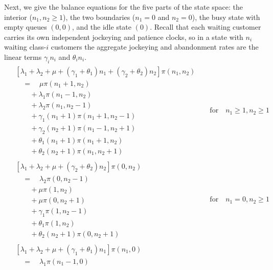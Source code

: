 Next, we give the balance equations for the five parts of the state space: the interior ($n_1,n_2\ge1$), the two boundaries ($n_1=0$ and $n_2=0$), the busy state with empty queues $(0,0)$, and the idle state $(0)$. Recall that each waiting customer carries its own independent jockeying and patience clocks, so in a state with $n_i$ waiting class-$i$ customers the aggregate jockeying and abandonment rates are the linear terms $\gamma_i n_i$ and $\theta_i n_i$.
\begin{align}
    \begin{split}
        &\left[\lambda_1 + \lambda_2 + \mu + (\gamma_1 + \theta_1) n_1 + (\gamma_2 + \theta_2) n_2\right] \pi(n_1,n_2) \\
        & \quad = \quad \mu \pi(n_1+1,n_2) \\
        & \quad \quad + \lambda_1 \pi(n_1-1,n_2) \\
        & \quad \quad + \lambda_2 \pi(n_1,n_2-1) \\
        & \quad \quad + \gamma_1 (n_1+1) \pi(n_1+1,n_2-1) \\
        & \quad \quad + \gamma_2 (n_2+1) \pi(n_1-1,n_2+1) \\
        & \quad \quad + \theta_1 (n_1+1) \pi(n_1+1,n_2) \\
        & \quad \quad + \theta_2 (n_2+1) \pi(n_1,n_2+1)
    \end{split}
    && \text{for} \quad n_1 \geq 1, n_2 \geq 1 \label{eq:gen:balance_interior}\\
    \begin{split}
        & \left[ \lambda_1 + \lambda_2 + \mu +  (\gamma_2 + \theta_2) n_2 \right] \pi(0,n_2) \\
        & \quad = \quad \lambda_2 \pi(0,n_2-1) \\
        & \quad \quad + \mu \pi(1,n_2) \\
        & \quad \quad + \mu \pi(0,n_2+1) \\
        & \quad \quad + \gamma_1 \pi(1, n_2-1) \\
        & \quad \quad + \theta_1 \pi(1, n_2) \\
        & \quad \quad + \theta_2(n_2+1) \pi(0,n_2+1)
    \end{split}
    && \text{for} \quad n_1=0, n_2 \geq 1 \label{eq:gen:balance_y_boundary}\\
    \begin{split}
        & \left[ \lambda_1 + \lambda_2 + \mu + (\gamma_1 + \theta_1) n_1 \right] \pi(n_1,0) \\
        & \quad = \quad \lambda_1 \pi(n_1-1,0) \\

\end{split}
\end{align}
